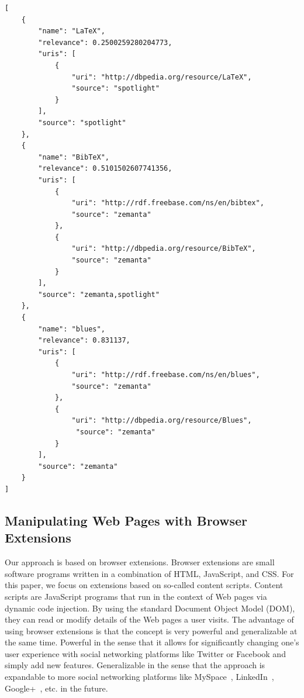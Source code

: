 \documentclass{iosart2c}
\begin{document}
\begin{lstlisting}[caption={Named entity disambiguation wrapper API output in JSON form for the micropost \textit{``Tom has the LaTeX, BibTeX, LaTeX, LaTeX blues...''}.},label={lst:nlpjson}]
[
    {
        "name": "LaTeX",
        "relevance": 0.2500259280204773,
        "uris": [
            {
                "uri": "http://dbpedia.org/resource/LaTeX",
                "source": "spotlight"
            }
        ],
        "source": "spotlight"
    },
    {
        "name": "BibTeX",
        "relevance": 0.5101502607741356,
        "uris": [
            {
                "uri": "http://rdf.freebase.com/ns/en/bibtex",
                "source": "zemanta"
            },
            {
                "uri": "http://dbpedia.org/resource/BibTeX",
                "source": "zemanta"
            }
        ],
        "source": "zemanta,spotlight"
    },
    {
        "name": "blues",
        "relevance": 0.831137,
        "uris": [
            {
                "uri": "http://rdf.freebase.com/ns/en/blues",
                "source": "zemanta"
            },
            {
                "uri": "http://dbpedia.org/resource/Blues",
                 "source": "zemanta"
            }
        ],
        "source": "zemanta"
    }    
]
\end{lstlisting}

\subsection{Manipulating Web Pages with Browser Extensions}
Our approach is based on browser extensions.
Browser extensions are small software programs written in a combination of HTML, JavaScript, and CSS.
For this paper, we focus on extensions based on so-called content scripts.
Content scripts are JavaScript programs that run in the context of Web pages via dynamic code injection.
By using the standard Document Object Model (DOM), they can read or modify details of the Web pages a user visits.
The advantage of using browser extensions is that the concept is very powerful and generalizable at the same time.
Powerful in the sense that it allows for significantly changing one's user experience with social networking platforms like Twitter or Facebook and simply add new features.
Generalizable in the sense that the approach is expandable to more social networking platforms like MySpace~\cite{MySpace}, LinkedIn~\cite{LinkedIn}, Google+~\cite{GooglePlus}, etc. in the future.
\end{document}
